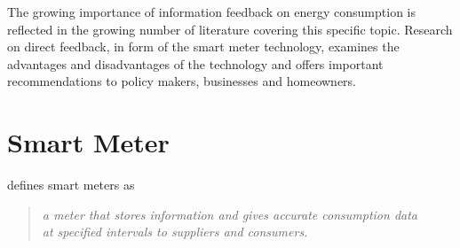 %
%

% 

The growing importance of information feedback on energy consumption is reflected in the growing number of literature covering this specific topic. Research on direct feedback, in form of the smart meter technology, examines the advantages and disadvantages of the technology and offers important recommendations to policy makers, businesses and homeowners.

\section{Smart Meter}
\label{ch:Content1:sec:Smart Meter}
\citep{Darby2008} defines smart meters as 
\begin{quotation}
\textit{a meter that stores information and gives accurate consumption data\\ 
at specified intervals to suppliers and consumers.}
\end{quotation}

